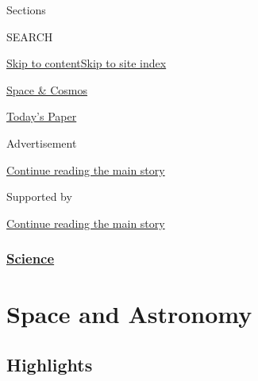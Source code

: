 Sections

SEARCH

\protect\hyperlink{site-content}{Skip to
content}\protect\hyperlink{site-index}{Skip to site index}

\href{https://www.nytimes3xbfgragh.onion/section/science/space}{Space \&
Cosmos}

\href{https://myaccount.nytimes3xbfgragh.onion/auth/login?response_type=cookie\&client_id=vi}{}

\href{https://www.nytimes3xbfgragh.onion/section/todayspaper}{Today's
Paper}

Advertisement

\protect\hyperlink{after-top}{Continue reading the main story}

Supported by

\protect\hyperlink{after-sponsor}{Continue reading the main story}

\hypertarget{science}{%
\subsubsection{\texorpdfstring{\href{/section/science}{Science}}{Science}}\label{science}}

\hypertarget{space-and-astronomy}{%
\section{Space and Astronomy}\label{space-and-astronomy}}

\hypertarget{highlights}{%
\subsection{Highlights}\label{highlights}}

